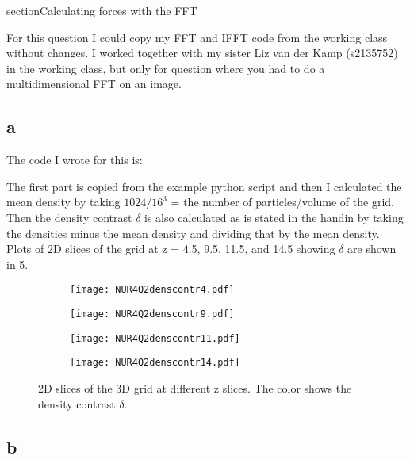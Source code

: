 section{Calculating forces with the FFT}

For this question I could copy my FFT and IFFT code from the working class without changes. 
I worked together with my sister Liz van der Kamp (s2135752) in the working class, but only for question where you had to do a multidimensional FFT on an image. 

\subsection*{a}

The code I wrote for this is:


The first part is copied from the example python script and then I calculated the mean density by taking $1024/16^3$ = the number of particles/volume of the grid. Then the density contrast $\delta$ is also calculated as is stated in the handin by taking the densities minus the mean density and dividing that by the mean density. 
Plots of 2D slices of the grid at z = 4.5, 9.5, 11.5, and 14.5 showing $\delta$ are shown in \ref{fig:fig1}.

\begin{figure}[ht]
    \begin{subfigure}{.49\textwidth}
       \centering
    \texttt{[image: NUR4Q2denscontr4.pdf]}
    \centering
    \label{}
    \end{subfigure}
    \hfill
    \begin{subfigure}{.49\textwidth}
       \centering
    \texttt{[image: NUR4Q2denscontr9.pdf]}
    \centering
    \label{}
    \end{subfigure}
     \begin{subfigure}{.49\textwidth}
       \centering
    \texttt{[image: NUR4Q2denscontr11.pdf]}
    \centering
    \label{}
    \end{subfigure}
     \begin{subfigure}{.49\textwidth}
       \centering
    \texttt{[image: NUR4Q2denscontr14.pdf]}
    \centering
    \label{}
    \end{subfigure}
    \caption{2D slices of the 3D grid at different z slices. The color shows the density contrast $\delta$.}
    \label{fig:fig1}
\end{figure}

\subsection*{b}

